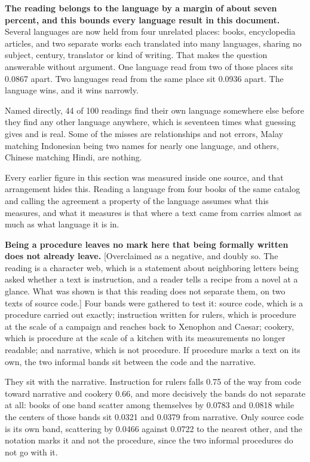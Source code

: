\textbf{The reading belongs to the language by a margin of about seven percent, and this bounds every language result in this document.} Several languages are now held from four unrelated places: books, encyclopedia articles, and two separate works each translated into many languages, sharing no subject, century, translator or kind of writing. That makes the question answerable without argument. One language read from two of those places sits 0.0867 apart. Two languages read from the same place sit 0.0936 apart. The language wins, and it wins narrowly.

Named directly, 44 of 100 readings find their own language somewhere else before they find any other language anywhere, which is seventeen times what guessing gives and is real. Some of the misses are relationships and not errors, Malay matching Indonesian being two names for nearly one language, and others, Chinese matching Hindi, are nothing.

Every earlier figure in this section was measured inside one source, and that arrangement hides this. Reading a language from four books of the same catalog and calling the agreement a property of the language assumes what this measures, and what it measures is that where a text came from carries almost as much as what language it is in.

\textbf{Being a procedure leaves no mark here that being formally written does not already leave.} [Overclaimed as a negative, and doubly so. The reading is a character web, which is a statement about neighboring letters being asked whether a text is instruction, and a reader tells a recipe from a novel at a glance. What was shown is that this reading does not separate them, on two texts of source code.] Four bands were gathered to test it: source code, which is a procedure carried out exactly; instruction written for rulers, which is procedure at the scale of a campaign and reaches back to Xenophon and Caesar; cookery, which is procedure at the scale of a kitchen with its measurements no longer readable; and narrative, which is not procedure. If procedure marks a text on its own, the two informal bands sit between the code and the narrative.

They sit with the narrative. Instruction for rulers falls 0.75 of the way from code toward narrative and cookery 0.66, and more decisively the bands do not separate at all: books of one band scatter among themselves by 0.0783 and 0.0818 while the centers of those bands sit 0.0321 and 0.0379 from narrative. Only source code is its own band, scattering by 0.0466 against 0.0722 to the nearest other, and the notation marks it and not the procedure, since the two informal procedures do not go with it.

